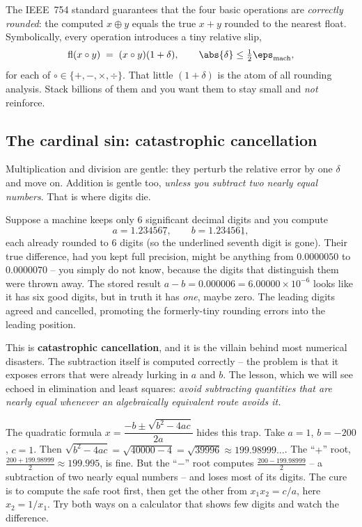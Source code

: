 The IEEE~754 standard guarantees that the four basic operations are \emph{correctly
rounded}: the computed $x \oplus y$ equals the true $x+y$ rounded to the nearest
float. Symbolically, every operation introduces a tiny relative slip,
\[
  \text{fl}(x \circ y) \;=\; (x \circ y)(1+\delta), \qquad \abs{\delta}\le \tfrac12\eps_{\text{mach}},
\]
for each of $\circ \in \{+,-,\times,\div\}$. That little $(1+\delta)$ is the atom of
all rounding analysis. Stack billions of them and you want them to stay small and
\emph{not} reinforce.

\subsection{The cardinal sin: catastrophic cancellation}

Multiplication and division are gentle: they perturb the relative error by one
$\delta$ and move on. Addition is gentle too, \emph{unless you subtract two nearly
equal numbers}. That is where digits die.

\begin{example}
\label{ch33:cancel}
Suppose a machine keeps only $6$ significant decimal digits and you compute
\[
  a = 1.23456\underline{7}, \qquad b = 1.23456\underline{1},
\]
each already rounded to $6$ digits (so the underlined seventh digit is gone). Their
true difference, had you kept full precision, might be anything from $0.0000050$ to
$0.0000070$ -- you simply do not know, because the digits that distinguish them were
thrown away. The stored result $a-b = 0.000006 = 6.00000\times 10^{-6}$ looks like it
has six good digits, but in truth it has \emph{one}, maybe zero. The leading digits
agreed and cancelled, promoting the formerly-tiny rounding errors into the leading
position.
\end{example}

This is \textbf{catastrophic cancellation}, and it is the villain behind most
numerical disasters. The subtraction itself is computed correctly -- the problem is
that it exposes errors that were already lurking in $a$ and $b$. The lesson, which we
will see echoed in elimination and least squares: \emph{avoid subtracting quantities
that are nearly equal whenever an algebraically equivalent route avoids it.}

\begin{labbox}
The quadratic formula $x = \dfrac{-b \pm \sqrt{b^2-4ac}}{2a}$ hides this trap. Take
$a=1$, $b=-200$, $c=1$. Then $\sqrt{b^2-4ac}=\sqrt{40000-4}=\sqrt{39996}\approx
199.98999\ldots$. The ``$+$'' root, $\tfrac{200+199.98999}{2}\approx 199.995$, is fine.
But the ``$-$'' root computes $\tfrac{200-199.98999}{2}$ -- a subtraction of two nearly
equal numbers -- and loses most of its digits. The cure is to compute the safe root
first, then get the other from $x_1 x_2 = c/a$, here $x_2 = 1/x_1$. Try both ways on a
calculator that shows few digits and watch the difference.
\end{labbox}

